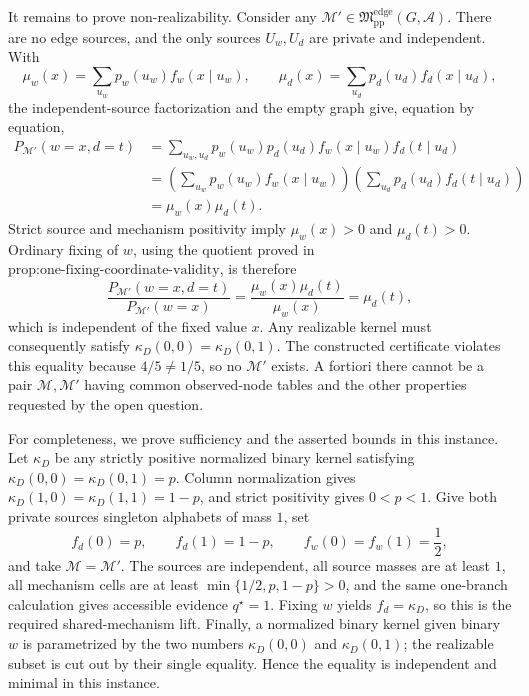 It remains to prove non-realizability.  Consider any \(\mathcal M'\in\mathfrak M_{\mathrm{pp}}^{\mathrm{edge}}(G,\mathcal A)\).  There are no edge sources, and the only sources \(U_w,U_d\) are private and independent.  With
\[
 \mu_w(x)=\sum_{u_w}p_w(u_w)f_w(x\mid u_w),
 \qquad
 \mu_d(x)=\sum_{u_d}p_d(u_d)f_d(x\mid u_d),
\]
the independent-source factorization and the empty graph give, equation by equation,
\[
\begin{aligned}
P_{\mathcal M'}(w=x,d=t)
&=\sum_{u_w,u_d}p_w(u_w)p_d(u_d)
 f_w(x\mid u_w)f_d(t\mid u_d)\\
&=\left(\sum_{u_w}p_w(u_w)f_w(x\mid u_w)\right)
  \left(\sum_{u_d}p_d(u_d)f_d(t\mid u_d)\right)\\
&=\mu_w(x)\mu_d(t).
\end{aligned}
\]
Strict source and mechanism positivity imply \(\mu_w(x)>0\) and \(\mu_d(t)>0\).  Ordinary fixing of \(w\), using the quotient proved in \(\text{prop:one-fixing-coordinate-validity}\), is therefore
\[
 \frac{P_{\mathcal M'}(w=x,d=t)}{P_{\mathcal M'}(w=x)}
 =\frac{\mu_w(x)\mu_d(t)}{\mu_w(x)}=\mu_d(t),
\]
which is independent of the fixed value \(x\).  Any realizable kernel must consequently satisfy \(\kappa_D(0,0)=\kappa_D(0,1)\).  The constructed certificate violates this equality because \(4/5\ne1/5\), so no \(\mathcal M'\) exists.  A fortiori there cannot be a pair \(\mathcal M,\mathcal M'\) having common observed-node tables and the other properties requested by the open question.

For completeness, we prove sufficiency and the asserted bounds in this instance.  Let \(\kappa_D\) be any strictly positive normalized binary kernel satisfying \(\kappa_D(0,0)=\kappa_D(0,1)=p\).  Column normalization gives \(\kappa_D(1,0)=\kappa_D(1,1)=1-p\), and strict positivity gives \(0<p<1\).  Give both private sources singleton alphabets of mass \(1\), set
\[
 f_d(0)=p,\qquad f_d(1)=1-p,
 \qquad f_w(0)=f_w(1)=\frac12,
\]
and take \(\mathcal M=\mathcal M'\).  The sources are independent, all source masses are at least \(1\), all mechanism cells are at least \(\min\{1/2,p,1-p\}>0\), and the same one-branch calculation gives accessible evidence \(q^{\star}=1\).  Fixing \(w\) yields \(f_d=\kappa_D\), so this is the required shared-mechanism lift.  Finally, a normalized binary kernel given binary \(w\) is parametrized by the two numbers \(\kappa_D(0,0)\) and \(\kappa_D(0,1)\); the realizable subset is cut out by their single equality.  Hence the equality is independent and minimal in this instance.